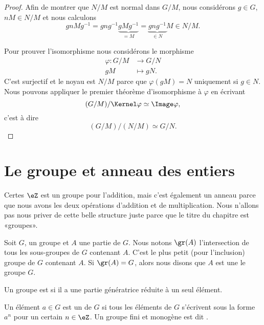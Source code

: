 \begin{proof}
    Afin de montrer que \( N/M\) est normal dans \( G/M\), nous considérons \( g\in G\), \( nM\in N/M\) et nous calculons
    \begin{equation}
        gnMg^{-1}=gng^{-1}\underbrace{gMg^{-1}}_{=M}=\underbrace{gng^{-1}}_{\in N}M\in N/M.
    \end{equation}

    Pour prouver l'isomorphisme nous considérons le morphisme
    \begin{equation}
        \begin{aligned}
            \varphi\colon G/M&\to G/N \\
            gM&\mapsto gN. 
        \end{aligned}
    \end{equation}
    C'est surjectif et le noyau est \( N/M\) parce que \( \varphi(gM)=N\) uniquement si \( g\in N\). Nous pouvons appliquer le premier théorème d'isomorphisme à \( \varphi\) en écrivant
    \begin{equation}
        (G/M)/\Kernel \varphi\simeq\Image \varphi,
    \end{equation}
    c'est à dire
    \begin{equation}
        (G/M)/(N/M)\simeq G/N.
    \end{equation}
\end{proof}

\section{Le groupe et anneau des entiers}

Certes \( \eZ\) est un groupe pour l'addition, mais c'est également un anneau parce que nous avons les deux opérations d'addition et de multiplication. Nous n'allons pas nous priver de cette belle structure juste parce que le titre du chapitre est «groupes».

\begin{definition}
    Soit \( G\), un groupe et \( A\) une partie de \( G\). Nous notons \( \gr(A)\) l'intersection de tous les sous-groupes de \( G\) contenant \( A\). C'est le plus petit (pour l'inclusion) groupe de \( G\) contenant \( A\). Si \( \gr(A)=G\), alors nous disons que \( A\) est une  le groupe \( G\).

    Un groupe est  si il a une partie génératrice réduite à un seul élément.

    Un élément \( a\in G\) est un  de \( G\) si tous les éléments de \( G\) s'écrivent sous la forme \( a^n\) pour un certain \( n\in\eZ\). Un groupe fini et monogène est dit .
\end{definition}

